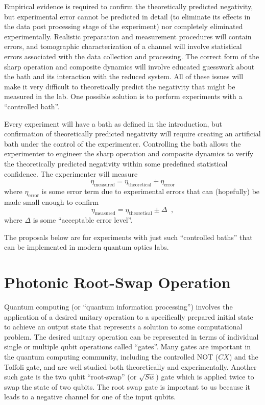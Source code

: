 Empirical evidence is required to confirm the theoretically predicted negativity, but experimental error cannot be predicted in detail (to eliminate its effects in the data post processing stage of the experiment) nor completely eliminated experimentally.  Realistic preparation and measurement procedures will contain errors, and tomographic characterization of a channel will involve statistical errors associated with the data collection and processing.  The correct form of the sharp operation and composite dynamics will involve educated guesswork about the bath and its interaction with the reduced system.  All of these issues will make it very difficult to theoretically predict the negativity that might be measured in the lab.  One possible solution is to perform experiments with a ``controlled bath''.

Every experiment will have a bath as defined in the introduction, but confirmation of theoretically predicted negativity will require creating an artificial bath under the control of the experimenter.  Controlling the bath allows the experimenter to engineer the sharp operation and composite dynamics to verify the theoretically predicted negativity within some predefined statistical confidence.  The experimenter will measure
$$
\eta_{\mathrm{measured}} = \eta_{\mathrm{theoretical}} + \eta_{\mathrm{error}}
$$
where $\eta_{\mathrm{error}}$ is some error term due to experimental errors that can (hopefully) be made small enough to confirm
$$
\eta_{\mathrm{measured}} = \eta_{\mathrm{theoretical}} \pm \Delta\;\;,
$$
where $\Delta$ is some ``acceptable error level''.  

The proposals below are for experiments with just such ``controlled baths'' that can be implemented in modern quantum optics labs.  

\section{Photonic Root-Swap Operation}

Quantum computing (or ``quantum information processing'') involves the application of a desired unitary operation to a specifically prepared initial state to achieve an output state that represents a solution to some computational problem.  The desired unitary operation can be represented in terms of individual single or multiple qubit operations called ``gates''.  Many gates are important in the quantum computing community, including the controlled NOT ($CX$) and the Toffoli gate, and are well studied both theoretically and experimentally.  Another such gate is the two qubit ``root-swap'' (or $\sqrt{Sw}$) gate which is applied twice to swap the state of two qubits.  The root swap gate is important to us because it leads to a negative channel for one of the input qubits.

